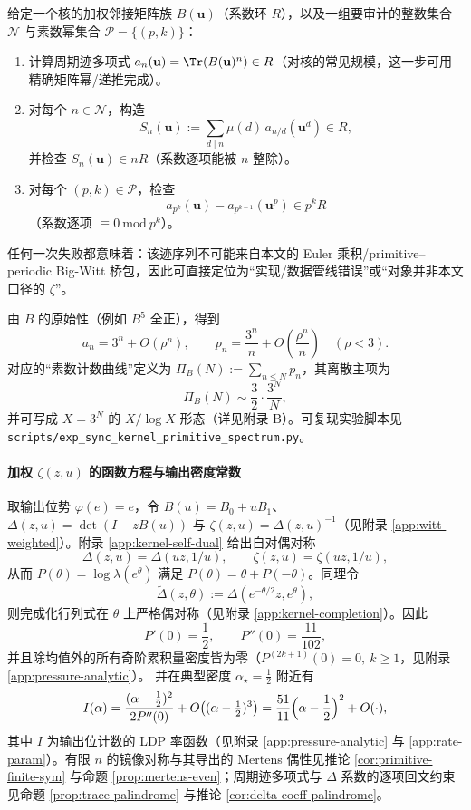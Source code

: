 \begin{algorithm}\label{alg:self-audit-witt}
给定一个核的加权邻接矩阵族 \(B(\mathbf u)\)（系数环 \(R\)），以及一组要审计的整数集合 \(\mathcal N\) 与素数幂集合 \(\mathcal P=\{(p,k)\}\)：
\begin{enumerate}
  \item 计算周期迹多项式 \(a_n(\mathbf u)=\Tr(B(\mathbf u)^n)\in R\)（对核的常见规模，这一步可用精确矩阵幂/递推完成）。
  \item 对每个 \(n\in\mathcal N\)，构造
  \[
  S_n(\mathbf u):=\sum_{d\mid n}\mu(d)\,a_{n/d}(\mathbf u^d)\in R,
  \]
  并检查 \(S_n(\mathbf u)\in nR\)（系数逐项能被 \(n\) 整除）。
  \item 对每个 \((p,k)\in\mathcal P\)，检查
  \[
  a_{p^k}(\mathbf u)-a_{p^{k-1}}(\mathbf u^p)\in p^kR
  \]
  （系数逐项 \(\equiv 0\ \mathrm{mod}\ p^k\)）。
\end{enumerate}
任何一次失败都意味着：该迹序列不可能来自本文的 Euler 乘积/primitive--periodic Big-Witt 桥包，因此可直接定位为“实现/数据管线错误”或“对象并非本文口径的 \(\zeta\)”。
\end{algorithm}

由 $B$ 的原始性（例如 $B^5$ 全正），得到
\[
a_n=3^n+O(\rho^n),\qquad
p_n=\frac{3^n}{n}+O\!\left(\frac{\rho^n}{n}\right)\quad(\rho<3).
\]
对应的“素数计数曲线”定义为 $\Pi_B(N):=\sum_{n\le N}p_n$，其离散主项为
\[
\Pi_B(N)\sim \frac{3}{2}\cdot \frac{3^N}{N},
\]
并可写成 $X=3^N$ 的 $X/\log X$ 形态（详见附录 B）。可复现实验脚本见 \texttt{scripts/exp\_sync\_kernel\_primitive\_spectrum.py}。

\paragraph{加权 $\zeta(z,u)$ 的函数方程与输出密度常数}
取输出位势 $\varphi(e)=e$，令 $B(u)=B_0+uB_1$、$\Delta(z,u)=\det(I-zB(u))$ 与 $\zeta(z,u)=\Delta(z,u)^{-1}$（见附录 \ref{app:witt-weighted}）。附录 \ref{app:kernel-self-dual} 给出自对偶对称
\[
\Delta(z,u)=\Delta(uz,1/u),\qquad
\zeta(z,u)=\zeta(uz,1/u),
\]
从而 $P(\theta)=\log\lambda(e^\theta)$ 满足 $P(\theta)=\theta+P(-\theta)$。同理令
\[
\widetilde{\Delta}(z,\theta):=\Delta(e^{-\theta/2}z,e^\theta),
\]
则完成化行列式在 $\theta$ 上严格偶对称（见附录 \ref{app:kernel-completion}）。因此
\[
P'(0)=\frac12,\qquad P''(0)=\frac{11}{102},
\]
并且除均值外的所有奇阶累积量密度皆为零（$P^{(2k+1)}(0)=0,\ k\ge 1$，见附录 \ref{app:pressure-analytic}）。
并在典型密度 $\alpha_\star=\frac12$ 附近有
\[
I(\alpha)=\frac{(\alpha-\frac12)^2}{2P''(0)}+O\!\left((\alpha-\tfrac12)^3\right)
=\frac{51}{11}\Bigl(\alpha-\frac12\Bigr)^2+O(\cdot),
\]
其中 $I$ 为输出位计数的 LDP 率函数（见附录 \ref{app:pressure-analytic} 与 \ref{app:rate-param}）。有限 $n$ 的镜像对称与其导出的 Mertens 偶性见推论 \ref{cor:primitive-finite-sym} 与命题 \ref{prop:mertens-even}；周期迹多项式与 $\Delta$ 系数的逐项回文约束见命题 \ref{prop:trace-palindrome} 与推论 \ref{cor:delta-coeff-palindrome}。


